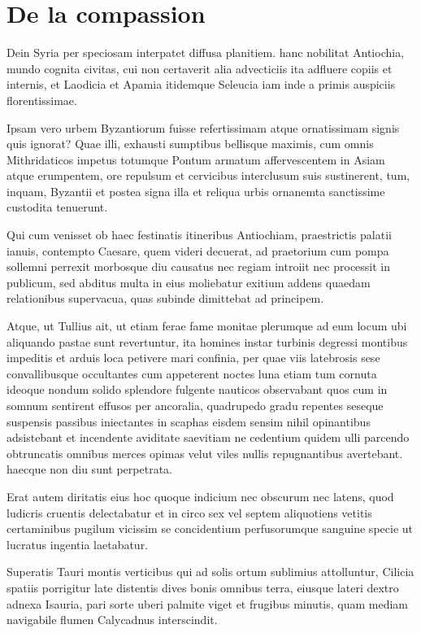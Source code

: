 
\section{De la compassion}

Dein Syria per speciosam interpatet diffusa planitiem. hanc nobilitat Antiochia, mundo cognita civitas, cui non certaverit alia 
advecticiis ita adfluere copiis et internis, et Laodicia et Apamia itidemque Seleucia iam inde a primis auspiciis florentissimae.

Ipsam vero urbem Byzantiorum fuisse refertissimam atque ornatissimam signis quis ignorat? Quae illi, exhausti sumptibus bellisque 
maximis, cum omnis Mithridaticos impetus totumque Pontum armatum affervescentem in Asiam atque erumpentem, ore repulsum 
et cervicibus interclusum suis sustinerent, tum, inquam, Byzantii et postea signa illa et reliqua urbis ornanemta sanctissime 
custodita tenuerunt.

Qui cum venisset ob haec festinatis itineribus Antiochiam, praestrictis palatii ianuis, contempto Caesare, quem videri decuerat, ad 
praetorium cum pompa sollemni perrexit morbosque diu causatus nec regiam introiit nec processit in publicum, sed abditus multa in 
eius moliebatur exitium addens quaedam relationibus supervacua, quas subinde dimittebat ad principem.

Atque, ut Tullius ait, ut etiam ferae fame monitae plerumque ad eum locum ubi aliquando pastae sunt revertuntur, ita homines 
instar turbinis degressi montibus impeditis et arduis loca petivere mari confinia, per quae viis latebrosis sese convallibusque 
occultantes cum appeterent noctes luna etiam tum cornuta ideoque nondum solido splendore fulgente nauticos observabant quos 
cum in somnum sentirent effusos per ancoralia, quadrupedo gradu repentes seseque suspensis passibus iniectantes in scaphas 
eisdem sensim nihil opinantibus adsistebant et incendente aviditate saevitiam ne cedentium quidem ulli parcendo obtruncatis 
omnibus merces opimas velut viles nullis repugnantibus avertebant. haecque non diu sunt perpetrata.

Erat autem diritatis eius hoc quoque indicium nec obscurum nec latens, quod ludicris cruentis delectabatur et in circo sex vel 
septem aliquotiens vetitis certaminibus pugilum vicissim se concidentium perfusorumque sanguine specie ut lucratus ingentia 
laetabatur.

Superatis Tauri montis verticibus qui ad solis ortum sublimius attolluntur, Cilicia spatiis porrigitur late distentis dives bonis omnibus 
terra, eiusque lateri dextro adnexa Isauria, pari sorte uberi palmite viget et frugibus minutis, quam mediam navigabile flumen 
Calycadnus interscindit.

